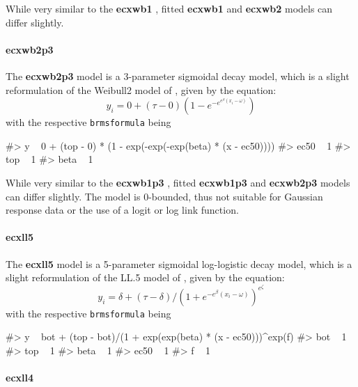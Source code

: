 While very similar to the \textbf{ecxwb1} \citep[according
to][]{Ritz2016}, fitted \textbf{ecxwb1} and \textbf{ecxwb2} models can
differ slightly.

\hypertarget{ecxwb2p3}{%
\paragraph{ecxwb2p3}\label{ecxwb2p3}}

The \textbf{ecxwb2p3} model is a 3-parameter sigmoidal decay model,
which is a slight reformulation of the Weibull2 model of
\citet{Ritz2016}, given by the equation:
\[y_i = {0} + (\tau -{0}) (1 - e^{-e^{e^{\beta} (x_i - \omega)}})\] with
the respective \texttt{brmsformula} being

\begin{Schunk}
\begin{Soutput}
#> y ~ 0 + (top - 0) * (1 - exp(-exp(-exp(beta) * (x - ec50)))) 
#> ec50 ~ 1
#> top ~ 1
#> beta ~ 1
\end{Soutput}
\end{Schunk}

While very similar to the \textbf{ecxwb1p3} \citep[according
to][]{Ritz2016}, fitted \textbf{ecxwb1p3} and \textbf{ecxwb2p3} models
can differ slightly. The model is 0-bounded, thus not suitable for
Gaussian response data or the use of a logit or log link function.

\hypertarget{ecxll5}{%
\paragraph{ecxll5}\label{ecxll5}}

The \textbf{ecxll5} model is a 5-parameter sigmoidal log-logistic decay
model, which is a slight reformulation of the LL.5 model of
\citet{Ritz2016}, given by the equation:
\[y_i = \delta + (\tau - \delta) / (1 + e^{-e^{\beta} (x_i - \omega)})^{e^\zeta}\]
with the respective \texttt{brmsformula} being

\begin{Schunk}
\begin{Soutput}
#> y ~ bot + (top - bot)/(1 + exp(exp(beta) * (x - ec50)))^exp(f) 
#> bot ~ 1
#> top ~ 1
#> beta ~ 1
#> ec50 ~ 1
#> f ~ 1
\end{Soutput}
\end{Schunk}

\hypertarget{ecxll4}{%
\paragraph{ecxll4}\label{ecxll4}}

